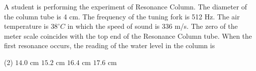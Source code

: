 
\item A student is performing the experiment of Resonance Column. The diameter of the column tube is 4 cm. The frequency of the tuning fork is 512 Hz. The air temperature is \(38^\circ C\) in which the speed of sound is 336 m/s. The zero of the meter scale coincides with the top end of the Resonance Column tube. When the first resonance occurs, the reading of the water level in the column is

\begin{tasks}(2)
\task \(14.0 \text{ cm}\)
\task \(15.2 \text{ cm}\)
\task \(16.4 \text{ cm}\)
\task \(17.6 \text{ cm}\)
\end{tasks}
